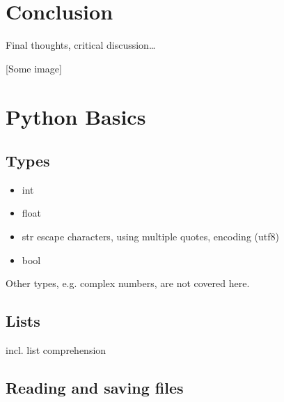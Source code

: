 \documentclass[letterpaper,10pt,english]{sphinxmanual}
\begin{document}
\chapter{Conclusion}
\label{\detokenize{conclusion:conclusion}}\label{\detokenize{conclusion::doc}}
Final thoughts, critical discussion…

{[}Some image{]}


\chapter{Python Basics}
\label{\detokenize{python_basics:python-basics}}\label{\detokenize{python_basics::doc}}

\section{Types}
\label{\detokenize{python_basics:types}}\begin{itemize}
\item {} 
int

\item {} 
float

\item {} 
str
\sphinxhyphen{} escape characters, using multiple quotes, encoding (utf\sphinxhyphen{}8)

\item {} 
bool

\end{itemize}

Other types, e.g. complex numbers, are not covered here.


\section{Lists}
\label{\detokenize{python_basics:lists}}
incl. list comprehension


\section{Reading and saving files}
\label{\detokenize{python_basics:reading-and-saving-files}}
\end{document}
